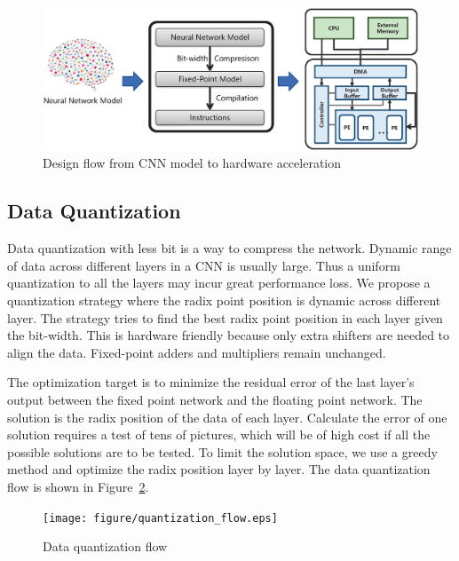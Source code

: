 \documentclass[10pt, conference, compsocconf]{IEEEtran}
\begin{document}
\begin{figure}[t]
  \centering
  \includegraphics[width=1.0\columnwidth]{figure/figure1.eps}
  \small
  \caption{Design flow from CNN model to hardware acceleration}
  \label{fig:flow}
\end{figure}

\subsection{Data Quantization}
Data quantization with less bit is a way to compress the network. Dynamic range of data across different layers in a CNN is usually large. Thus a uniform quantization to all the layers may incur great performance loss. We propose a quantization strategy where the radix point position is dynamic across different layer. The strategy tries to find the best radix point position in each layer given the bit-width. This is hardware friendly because only extra shifters are needed to align the data. Fixed-point adders and multipliers remain unchanged.

The optimization target is to minimize the residual error of the last layer's output between the fixed point network and the floating point network. The solution is the radix position of the data of each layer. Calculate the error of one solution requires a test of tens of pictures, which will be of high cost if all the possible solutions are to be tested. To limit the solution space, we use a greedy method and optimize the radix position layer by layer. The data quantization flow is shown in Figure~\ref{fig:quantization}.

\begin{figure}[t]
    \centering
    \texttt{[image: figure/quantization\_flow.eps]}
    \small
    \caption{Data quantization flow~\cite{qiu2016going}}
    \label{fig:quantization}
\end{figure}
\end{document}

